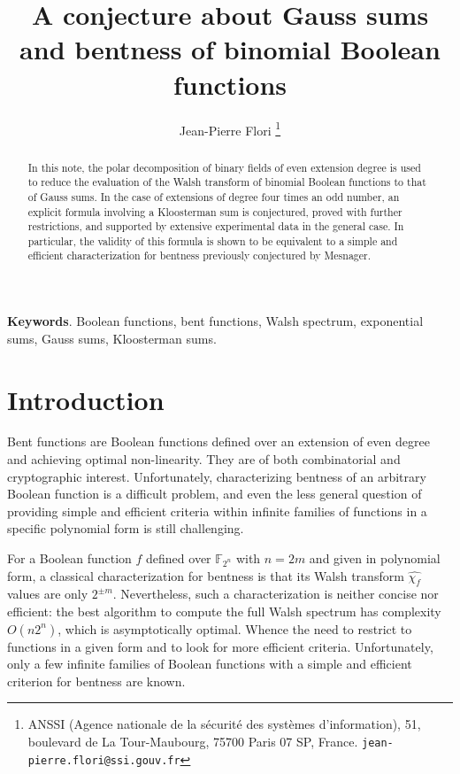 \documentclass[11pt,a4paper]{article}
\title{A conjecture about Gauss sums and bentness of binomial Boolean functions}
\author{Jean-Pierre Flori
  \thanks{ANSSI (Agence nationale de la sécurité des systèmes d'information),
    51, boulevard de La Tour-Maubourg,
    75700 Paris 07 SP, France.
    \texttt{jean-pierre.flori@ssi.gouv.fr}}
}
\date{}
\newcommand{\GF}[2][2]{\mathbb{F}_{#1^{#2}}}
\newcommand{\Wa}[1]{\widehat{\chi_{#1}}}
\begin{document}
\maketitle

\begin{abstract}
  In this note, the polar decomposition of binary fields of even extension degree is
  used to reduce the evaluation of the Walsh transform of binomial Boolean functions
  to that of Gauss sums.
  In the case of extensions of degree four times an odd number, an explicit formula involving a Kloosterman sum is conjectured,
  proved with further restrictions, and supported by extensive experimental
  data in the general case.
  In particular, the validity of this formula is shown to be equivalent
  to a simple and efficient characterization for bentness
  previously conjectured by Mesnager.
\end{abstract}

\noindent
{\bf Keywords}. Boolean functions, bent functions, Walsh spectrum, exponential sums, Gauss sums, Kloosterman sums.


\section{Introduction}
\label{sec:introduction}

Bent functions are Boolean functions defined over an extension of even
degree and achieving optimal non-linearity.
They are of both combinatorial and cryptographic interest.
Unfortunately, characterizing bentness of an arbitrary Boolean function
is a difficult problem,
and even the less general question of providing simple and efficient
criteria within infinite families of functions in a specific polynomial form
is still challenging.

For a Boolean function $f$ defined over $\GF{n}$ with $n = 2 m$ and
given in polynomial form, a classical characterization for bentness
is that its Walsh transform $\Wa{f}$ values are only $2^{\pm m}$.
Nevertheless, such a characterization is neither concise nor efficient:
the best algorithm to compute the full Walsh spectrum has complexity $O(n 2^n)$,
which is asymptotically optimal.
Whence the need to restrict to functions
in a given form and to look for more efficient criteria.
Unfortunately, only a few infinite families of Boolean functions
with a simple and efficient criterion for bentness are known.
\end{document}
